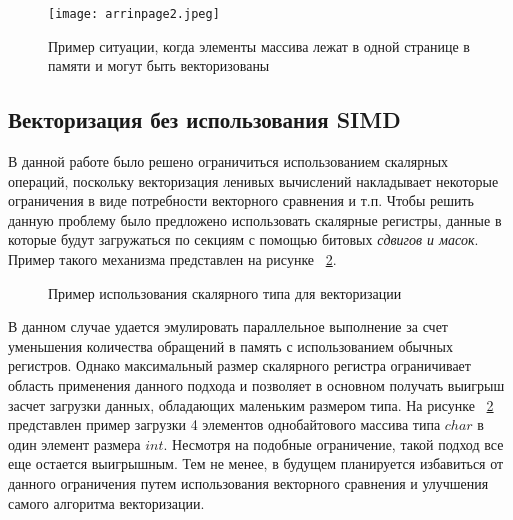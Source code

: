 \begin{figure}[!htb]
    \centering
    \texttt{[image: arrinpage2.jpeg]}
    \caption{Пример ситуации, когда элементы массива лежат в одной странице в памяти и могут быть векторизованы}
    \label{arr2}
\end{figure}

\subsection{Векторизация без использования SIMD}

В данной работе было решено ограничиться использованием скалярных операций, поскольку векторизация ленивых вычислений накладывает некоторые ограничения в виде потребности векторного сравнения и т.п. Чтобы решить данную проблему было предложено использовать скалярные регистры, данные в которые будут загружаться по секциям с помощью битовых \textit{сдвигов и масок}. Пример такого механизма представлен на рисунке ~\ref{charint}.

\begin{figure}[!htb]
    \centering
    
    \caption{Пример использования скалярного типа для векторизации}
    \label{charint}
\end{figure}

В данном случае удается эмулировать параллельное выполнение за счет уменьшения количества обращений в память с использованием обычных регистров. Однако максимальный размер скалярного регистра ограничивает область применения данного подхода и позволяет в основном получать выигрыш засчет загрузки данных, обладающих маленьким размером типа. На рисунке ~\ref{charint} представлен пример загрузки 4 элементов однобайтового массива типа $char$ в один элемент размера $int$. Несмотря на подобные ограничение, такой подход все еще остается выигрышным. Тем не менее, в будущем планируется избавиться от данного ограничения путем использования векторного сравнения и улучшения самого алгоритма векторизации.  
\newpage
